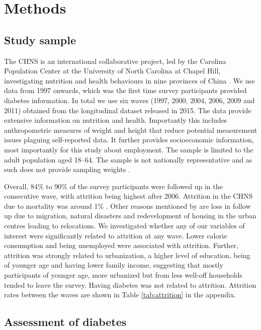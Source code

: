 \section{\label{sec:Methods5}Methods}

\subsection{Study sample}


The \acf{CHNS} is an international collaborative project, led by the Carolina Population Center at the University of North Carolina at Chapel Hill, investigating nutrition and health behaviours in nine provinces of China \parencite{Zhang2014d}. We use data from 1997 onwards, which was the first time survey participants provided diabetes information. In total we use six waves (1997, 2000, 2004, 2006, 2009 and 2011) obtained from the longitudinal dataset released in 2015. The data provide extensive information on nutrition and health. Importantly this includes anthropometric measures of weight and height that reduce potential measurement issues plaguing self-reported data. It further provides socioeconomic information, most importantly for this study about employment. The sample is limited to the adult population aged 18--64.  The sample is not nationally representative and as such does not provide sampling weights  \parencite{Popkin2010}.

Overall, 84\% to 90\% of the survey participants were followed up in the consecutive wave, with attrition being highest after 2006. Attrition in the \ac{CHNS} due to mortality was around 1\% \parencite{Popkin2010}. Other reasons mentioned by \textcite{Popkin2010} are loss in follow up due to migration, natural disasters and redevelopment of housing in the urban centres leading to relocations. We investigated whether any of our variables of interest were significantly related to attrition at any wave. Lower calorie consumption and being unemployed were associated with attrition. Further, attrition was strongly related to urbanization, a higher level of education, being of younger age and having lower family income, suggesting that mostly participants of younger age, more urbanized but from less well-off households tended to leave the survey. Having diabetes was not related to attrition. Attrition rates between the waves are shown in Table \ref{tab:attrition} in the appendix.


\subsection{Assessment of diabetes}

